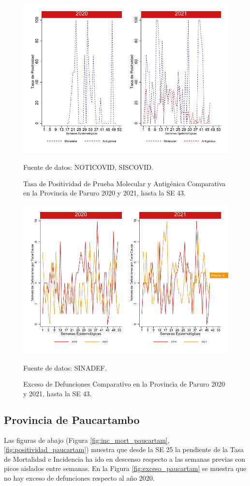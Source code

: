 \documentclass[12pt,a4paper,openany]{book}
\begin{document}
		\begin{figure}[h]
			\caption{Tasa de Positividad de Prueba Molecular y Antigénica Comparativa en la Provincia de Paruro 2020 y 2021, hasta la SE 43.}\label{fig:positividad_paruro}
			\begin{center}
				\includegraphics[width=0.7\linewidth]{../figuras/positividad_20_21_10}
			\end{center}
			{\footnotesize {Fuente de datos: NOTICOVID, SISCOVID.}}
		\end{figure}
		
		\begin{figure}[h]
			\caption{Exceso de Defunciones Comparativo en la Provincia de Paruro 2020 y 2021, hasta la SE 43.}\label{fig:exceso_paruro}
			\begin{center}
				\includegraphics[width=0.7\linewidth]{../figuras/exceso_10}
			\end{center}
			{\footnotesize {Fuente de datos: SINADEF.}}
		\end{figure}
		
		
		\clearpage
		
		\subsection*{Provincia de Paucartambo}
		\noindent Las figuras de abajo (Figura \ref{fig:inc_mort_paucartam}, \ref{fig:positividad_paucartam}) muestra que desde la SE 25 la pendiente de la Tasa de Mortalidad e Incidencia ha ido en descenso respecto a las semanas previas con picos aislados entre semanas. En la Figura \ref{fig:exceso_paucartam} se muestra que no hay exceso de defunciones respecto al año 2020.
		
\end{document}
